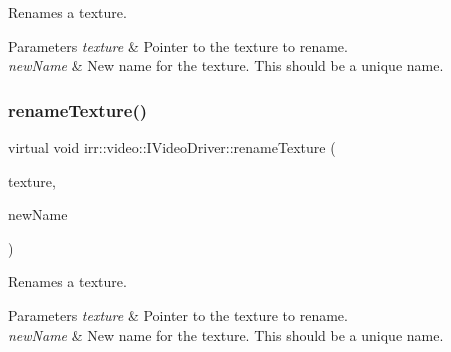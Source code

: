 Renames a texture. 


\begin{DoxyParams}{Parameters}
{\em texture} & Pointer to the texture to rename. \\
\hline
{\em new\+Name} & New name for the texture. This should be a unique name. \\
\hline
\end{DoxyParams}
\mbox{\label{classirr_1_1video_1_1IVideoDriver_a2cefddb9ebd7f46ee946c04b301a5c5b}} 
\subsubsection{\texorpdfstring{rename\+Texture()}{renameTexture()}\hspace{0.1cm}{\footnotesize\ttfamily [2/2]}}
{\footnotesize\ttfamily virtual void irr\+::video\+::\+I\+Video\+Driver\+::rename\+Texture (\begin{DoxyParamCaption}\item[{\hyperlink{classirr_1_1video_1_1ITexture}{I\+Texture} $\ast$}]{texture,  }\item[{const \hyperlink{namespaceirr_1_1io_a6468281622ce3a1c46b72e19f32dded5}{io\+::path} \&}]{new\+Name }\end{DoxyParamCaption})\hspace{0.3cm}{\ttfamily [pure virtual]}}



Renames a texture. 


\begin{DoxyParams}{Parameters}
{\em texture} & Pointer to the texture to rename. \\
\hline
{\em new\+Name} & New name for the texture. This should be a unique name. \\
\hline
\end{DoxyParams}
\mbox{\label{classirr_1_1video_1_1IVideoDriver_ae2ba500924a7d74fe74dd4724b737628}} 
